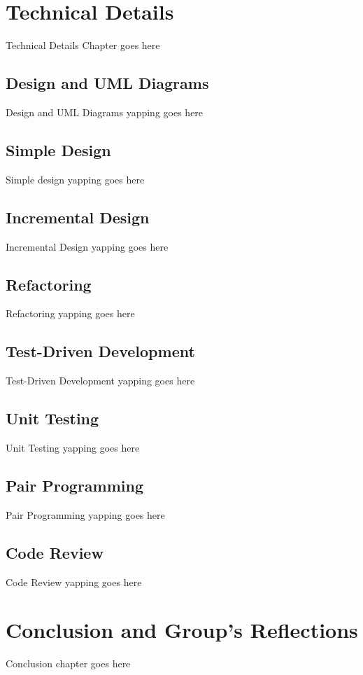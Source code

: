\documentclass[12pt]{report}
\begin{document}
\chapter{Technical Details}
Technical Details Chapter goes here

\section{Design and UML Diagrams}
Design and UML Diagrams yapping goes here

\section{Simple Design}
Simple design yapping goes here

\section{Incremental Design}
Incremental Design yapping goes here

\section{Refactoring}
Refactoring yapping goes here

\section{Test-Driven Development}
Test-Driven Development yapping goes here

\section{Unit Testing}
Unit Testing yapping goes here

\section{Pair Programming}
Pair Programming yapping goes here

\section{Code Review}
Code Review yapping goes here

\chapter{Conclusion and Group's Reflections}
Conclusion chapter goes here
\end{document}

